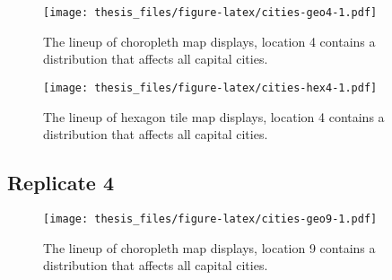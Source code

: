 \documentclass{monashthesis}
\begin{document}
\begin{figure}
\centering
\texttt{[image: thesis\_files/figure-latex/cities-geo4-1.pdf]}
\caption{\label{fig:cities-geo4}The lineup of choropleth map displays, location 4 contains a distribution that affects all capital cities.}
\end{figure}

\begin{Shaded}
\begin{Highlighting}[]
\NormalTok{() }\OperatorTok{+}
\StringTok{  }\NormalTok{(}\NormalTok{(}\NormalTok{(}\NormalTok{)))}
\end{Highlighting}
\end{Shaded}

\begin{figure}
\centering
\texttt{[image: thesis\_files/figure-latex/cities-hex4-1.pdf]}
\caption{\label{fig:cities-hex4}The lineup of hexagon tile map displays, location 4 contains a distribution that affects all capital cities.}
\end{figure}

\hypertarget{replicate-4}{%
\subsection{Replicate 4}\label{replicate-4}}

\begin{Shaded}
\begin{Highlighting}[]
\NormalTok{() }\OperatorTok{+}
\StringTok{  }\NormalTok{(}\NormalTok{(}\NormalTok{(}\NormalTok{)))}
\end{Highlighting}
\end{Shaded}

\begin{figure}
\centering
\texttt{[image: thesis\_files/figure-latex/cities-geo9-1.pdf]}
\caption{\label{fig:cities-geo9}The lineup of choropleth map displays, location 9 contains a distribution that affects all capital cities.}
\end{figure}

\begin{Shaded}
\begin{Highlighting}[]
\NormalTok{() }\OperatorTok{+}
\StringTok{  }\NormalTok{(}\NormalTok{(}\NormalTok{(}\NormalTok{)))}
\end{Highlighting}
\end{Shaded}
\end{document}

